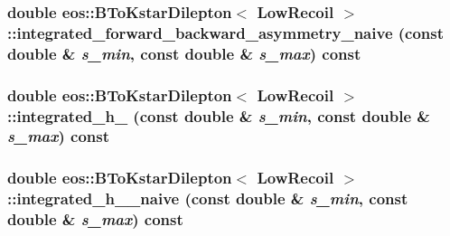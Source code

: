 \label{classeos_1_1BToKstarDilepton_3_01LowRecoil_01_4_a9d215ad72958a94dd32cd6bd2538486a}
\hypertarget{classeos_1_1BToKstarDilepton_3_01LowRecoil_01_4_a05e129e772037a0775b5a27bcba4ee9e}{
\subsubsection[{integrated\_\-forward\_\-backward\_\-asymmetry\_\-naive}]{\setlength{\rightskip}{0pt plus 5cm}double eos::BToKstarDilepton$<$ {\bf LowRecoil} $>$::integrated\_\-forward\_\-backward\_\-asymmetry\_\-naive (const double \& {\em s\_\-min}, \/  const double \& {\em s\_\-max}) const}}
\label{classeos_1_1BToKstarDilepton_3_01LowRecoil_01_4_a05e129e772037a0775b5a27bcba4ee9e}
\hypertarget{classeos_1_1BToKstarDilepton_3_01LowRecoil_01_4_a48ef64b2365fb8a709bee76c27122006}{
\subsubsection[{integrated\_\-h\_\-1}]{\setlength{\rightskip}{0pt plus 5cm}double eos::BToKstarDilepton$<$ {\bf LowRecoil} $>$::integrated\_\-h\_ (const double \& {\em s\_\-min}, \/  const double \& {\em s\_\-max}) const}}
\label{classeos_1_1BToKstarDilepton_3_01LowRecoil_01_4_a48ef64b2365fb8a709bee76c27122006}
\hypertarget{classeos_1_1BToKstarDilepton_3_01LowRecoil_01_4_a39d76e0ebc3397bfd09e3e5574e3d279}{
\subsubsection[{integrated\_\-h\_\-1\_\-naive}]{\setlength{\rightskip}{0pt plus 5cm}double eos::BToKstarDilepton$<$ {\bf LowRecoil} $>$::integrated\_\-h\_\_\-naive (const double \& {\em s\_\-min}, \/  const double \& {\em s\_\-max}) const}}
